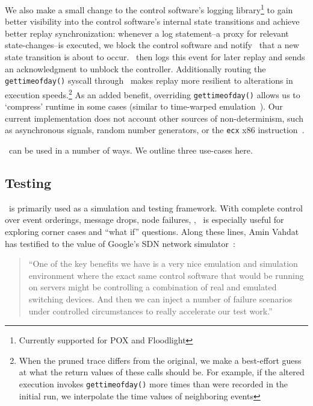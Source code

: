 We also make a
small change to the control software's logging library\footnote{Currently
supported for POX
and Floodlight} to gain better visibility into the control software's internal state
transitions and achieve better replay synchronization: whenever a log
statement--a proxy for relevant state-changes--is executed, we
block the control software and notify \projectname~that a new state transition
is about to occur. \projectname~then logs this event for later replay and
sends an acknowledgment to unblock the controller.
Additionally routing the {\tt gettimeofday()} syscall
through \projectname~makes replay more resilient to alterations in execution
speeds.\footnote{When the pruned trace differs from the original, we make a
best-effort guess at what the return values of these calls should be. For example,
if the altered execution invokes {\tt gettimeofday()} more times than were recorded
in the initial run, we interpolate the time values of neighboring events}
As an added benefit, overriding {\tt gettimeofday()} allows us to `compress'
runtime in some cases (similar to time-warped emulation~\cite{Gupta06toinfinity}).
Our current implementation does not account other sources of non-determinism,
such as asynchronous signals, random number generators,
or the {\tt ecx} x86 instruction~\cite{Dunlap:2002:REI:844128.844148}.

\projectname~can be used in a number of ways. We outline three use-cases here.


\subsection{Testing}

\projectname~is primarily used as a simulation and testing framework.
With complete control over event orderings, message drops, node
failures, \etc, \projectname~is especially useful for exploring corner cases
and ``what if'' questions. Along these lines, Amin Vahdat
has testified to the value of Google's SDN network simulator~\cite{vadhat}:
\begin{quote}
``One of the key benefits we have is a very nice emulation and
simulation environment where the exact same control software that would be
running on servers might be controlling a combination of real and emulated
switching devices. And then we can inject a number of failure scenarios under
controlled circumstances to really accelerate our test work.''
\end{quote}

